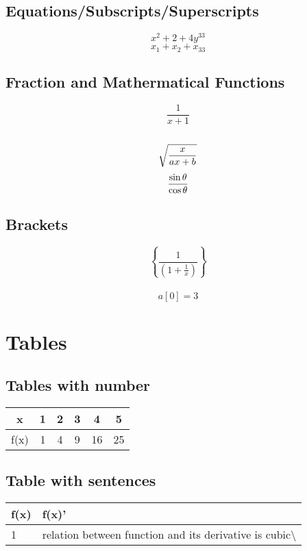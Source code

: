\documentclass[12pt]{article}%
\begin{document}
\subsection{Equations/Subscripts/Superscripts}%
\label{subsec:Equations/Subscripts/Superscripts}%

%
$$x^2+2+4y^{33}$$%
$$x_1 +x_2+x_{33}$$%
\subsection{Fraction and Mathermatical Functions}%
\label{subsec:FractionandMathermaticalFunctions}%

%
$$\frac{1}{x+1}$$\\[6pt]%
$$ \sqrt{ \frac{x}{ax+b} }\\[6pt] $$%
$$\frac{\sin \theta}{\cos \theta} \\[6pt]$$%
\subsection{Brackets}%
\label{subsec:Brackets}%

%
$$  \left\{  \frac{1} {  \left( 1 + \frac{1}{x}    \right)   }   \right\}$$ \\[6pt]%
$$ a[0] = 3  $$

%
\section{Tables}%
\label{sec:Tables}%
\vspace{4pt}%
\subsection{Tables with number}%
\label{subsec:Tableswithnumber}%

%
\begin{tabular}{|c|c|c|c|c|c|}%
\hline%
x & 1 & 2 & 3 & 4 & 5 \\%
\hline%
f(x) & 1 & 4 & 9 & 16 & 25 \\%
\hline%
\end{tabular}%
\subsection{Table with sentences}%
\label{subsec:Tablewithsentences}%

%
\begin{tabularx}{\textwidth}{|l|p{2in}|}%
\hline%
f(x)&f(x)'\\%
\hline%
1&relation between function and its derivative is cubic\textbackslash{}\\%
\hline%
\end{tabularx}

%
\end{document}
